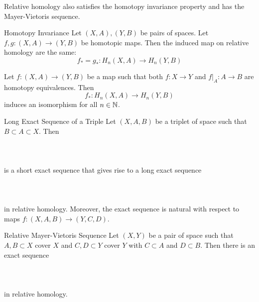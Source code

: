 \documentclass[a4paper]{article}
\begin{document}
Relative homology also satisfies the homotopy invariance property and has the Mayer-Vietoris sequence. 

\begin{thm}{Homotopy Invariance}{} Let $(X,A),(Y,B)$ be pairs of spaces. Let $f,g:(X,A)\to(Y,B)$ be homotopic maps. Then the induced map on relative homology are the same: $$f_\ast=g_\ast:H_n(X,A)\to H_n(Y,B)$$ 
\end{thm}

\begin{crl}{}{} Let $f:(X,A)\to (Y,B)$ be a map such that both $f:X\to Y$ and $f|_A:A\to B$ are homotopy equivalences. Then $$f_\ast:H_n(X,A)\to H_n(Y,B)$$ induces an isomorphism for all $n\in\mathbb{N}$. 
\end{crl}

\begin{prp}{Long Exact Sequence of a Triple}{} Let $(X,A,B)$ be a triplet of space such that $B\subset A\subset X$. Then \\~\\
\\~\\
is a short exact sequence that gives rise to a long exact sequence \\~\\
\\~\\
in relative homology. Moreover, the exact sequence is natural with respect to maps $f:(X,A,B)\to(Y,C,D)$. 
\end{prp}

\begin{thm}{Relative Mayer-Vietoris Sequence}{} Let $(X,Y)$ be a pair of space such that $A,B\subset X$ cover $X$ and $C,D\subset Y$ cover $Y$ with $C\subset A$ and $D\subset B$. Then there is an exact sequence \\~\\
\\~\\
in relative homology. 
\end{thm}
\end{document}
